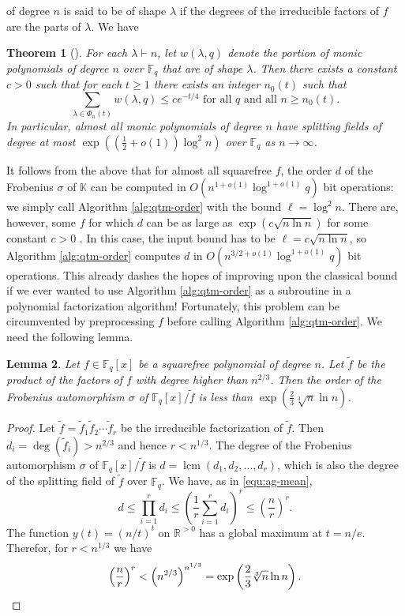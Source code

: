 \documentclass{article}
\theoremstyle{plain}
\newtheorem{theorem}{Theorem}
\newtheorem{lemma}[theorem]{Lemma}
\theoremstyle{definition}
\DeclareMathOperator{\lcm}{lcm} %
\def\K{\ensuremath{\mathbb{K}}}
\def\R{\ensuremath{\mathbb{R}}}
\def\F{\ensuremath{\mathbb{F}}}
\begin{document}
of degree $n$ is said to be of shape $\lambda$ if the degrees of the irreducible factors of $f$ are 
the parts of $\lambda$. We have
\begin{theorem}[{\cite[Theorem 1]{dixon2004degree}}]
\label{thm:split-order}
	For each $\lambda \vdash n$, let $w(\lambda, q)$ denote the portion of monic polynomials of 
	degree $n$ over $\F_q$ that are of shape $\lambda$. Then there exists a constant $c > 0$ 
	such that for each $t \ge 1$ there exists an integer $n_0(t)$ such that 
	\[ \sum_{\lambda \in \Phi_n(t)} w(\lambda, q) \le ce^{-t / 4} \text{ for all } q \text{ and all 
	} n \ge n_0(t). \]
	In particular, almost all monic polynomials of degree $n$ have splitting fields of degree at 
	most $\exp((\frac{1}{2} + o(1))\log^2n)$ over $\F_q$ as $n \to \infty$.
\end{theorem}
It follows from the above that for almost all squarefree $f$, the order $d$ of the Frobenius 
$\sigma$ of $\K$ can be computed in $O(n^{1 + o(1)}\log^{1 + o(1)}q)$ bit operations: we simply 
call Algorithm \ref{alg:qtm-order} with the bound $\ell = \log^2n$. There are, however, some $f$ 
for which $d$ can be as large as $\exp(c\sqrt{n \ln n})$ for some constant $c > 0$  
\cite{erdos1965some}. In this case, the input bound has to be $\ell = c\sqrt{n \ln n}$, so 
Algorithm \ref{alg:qtm-order} computes $d$ in $O(n^{3/2 + o(1)}\log^{1 + o(1)}q)$ bit operations. 
This already dashes the hopes of improving upon the classical bound if we ever wanted to use 
Algorithm \ref{alg:qtm-order} as a subroutine in a polynomial factorization algorithm! Fortunately, 
this problem can be circumvented by preprocessing $f$ before calling Algorithm \ref{alg:qtm-order}. 
We need the following lemma.
\begin{lemma}
\label{lem:frob-sub-ord}
	Let $f \in \F_q[x]$ be a squarefree polynomial of degree $n$. Let $\tilde{f}$ be the product of 
	the factors of $f$ with degree higher than $n^{2 / 3}$. Then the order of the Frobenius 
	automorphism $\sigma$ of $\F_q[x] / \tilde{f}$ is less than $\exp(\frac{2}{3}\sqrt[3]{n} \ln 
	n)$.
\end{lemma}
\begin{proof}
	Let $\tilde{f} = \tilde{f}_1\tilde{f}_2 \cdots \tilde{f}_r$ be the irreducible factorization of 
	$\tilde{f}$. Then $d_i = \deg(\tilde{f}_i) > n^{2 / 3}$ and hence $r < n^{1 / 3}$. The degree 
	of the Frobenius automorphism $\sigma$ of $\F_q[x] / \tilde{f}$ is $d = \lcm(d_1, d_2, \dots, 
	d_r)$, which is also the degree of the splitting field of $\tilde{f}$ over $\F_q$. We have, as 
	in 
	\eqref{equ:ag-mean},
	\[ d \le \prod_{i = 1}^rd_i \le \left( \frac{1}{r} \sum_{i = 1}^rd_i \right)^r \le \left( 
	\frac{n}{r} \right)^r. \]
	The function $y(t) = (n / t)^t$ on $\R^{> 0}$ has a global maximum at $t = n / e$. Therefor, 
	for $r < n^{1/3}$ we have
	\[ \left( \frac{n}{r} \right)^r < \left( n^{2 / 3} \right)^{n^{1 / 3}} = \exp\left( \frac{2}{3} 
	\sqrt[3]{n} \ln n \right). \qedhere \]
\end{proof}
\end{document}
